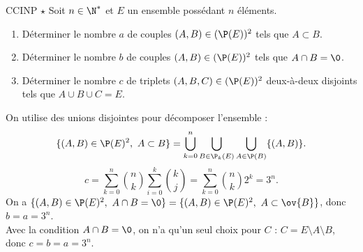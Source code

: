 \documentclass[11pt]{article}
\begin{document}

\begin{exercice}{CCINP $\star$}{}
    Soit $n\in\N^*$ et $E$ un ensemble possédant $n$ éléments.
    \begin{enumerate}
        \item Déterminer le nombre $a$ de couples $(A,B)\in(\P(E))^2$ tels que $A\subset B$.
        \item Déterminer le nombre $b$ de couples $(A,B)\in(\P(E))^2$ tels que $A\cap B=\0$.
        \item Déterminer le nombre $c$ de triplets $(A,B,C)\in(\P(E))^2$ deux-à-deux disjoints tels que $A\cup B\cup C=E$.
    \end{enumerate}
    \tcblower
     On utilise des unions disjointes pour décomposer l'ensemble :
    \begin{equation*}
        \{(A,B)\in\P(E)^2, ~ A \subset B\} = \bigcup_{k=0}^n\bigcup_{B \in \P_k(E)}\bigcup_{A\in \P(B)}\{(A,B)\}.
    \end{equation*}
    \begin{equation*}
        c=\sum_{k=0}^n\binom{n}{k}\sum_{i=0}^k\binom{k}{j} = \sum_{k=0}^n\binom{n}{k}2^k = 3^n.
    \end{equation*} 
     On a $\{(A,B)\in\P(E)^2, ~ A\cap B = \0\}=\{(A,B)\in\P(E)^2, ~ A\subset \ov{B}\}$, donc $b=a=3^n$.\\
     Avec la condition $A\cap B = \0$, on n'a qu'un seul choix pour $C$ : $C=E\setminus A \setminus B$, donc $c=b=a=3^n$.
\end{exercice}

\vspace*{-0.7cm}

\end{document}
